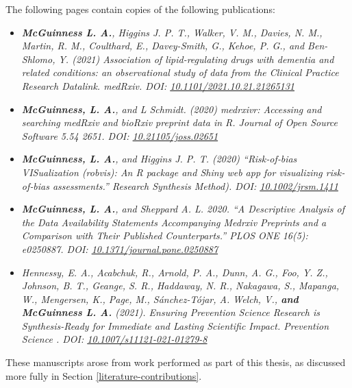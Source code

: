 \documentclass[a4paper, twoside]{templates/ociamthesis}
\newcommand*{\bibtitle}{Bibliography}
\begin{document}
The following pages contain copies of the following publications:

\begin{itemize}
\item
  \emph{\textbf{McGuinness L. A.}, Higgins J. P. T., Walker, V. M., Davies, N. M., Martin, R. M., Coulthard, E., Davey-Smith, G., Kehoe, P. G., and Ben-Shlomo, Y. (2021) Association of lipid-regulating drugs with dementia and related conditions: an observational study of data from the Clinical Practice Research Datalink. medRxiv. DOI: \href{https://doi.org/10.1101/2021.10.21.21265131}{10.1101/2021.10.21.21265131}}
\item
  \emph{\textbf{McGuinness, L. A.}, and L Schmidt. (2020) medrxivr: Accessing and searching medRxiv and bioRxiv preprint data in R. Journal of Open Source Software 5.54 2651. DOI: \href{https://doi.org/10.21105/joss.02651}{10.21105/joss.02651}}
\item
  \emph{\textbf{McGuinness, L. A.}, and Higgins J. P. T. (2020) ``Risk‐of‐bias VISualization (robvis): An R package and Shiny web app for visualizing risk‐of‐bias assessments.'' Research Synthesis Method). DOI: \href{https://doi.org/10.1002/jrsm.1411}{10.1002/jrsm.1411}}
\item
  \emph{\textbf{McGuinness, L. A.}, and Sheppard A. L. 2020. ``A Descriptive Analysis of the Data Availability Statements Accompanying Medrxiv Preprints and a Comparison with Their Published Counterparts.'' PLOS ONE 16(5): e0250887. DOI: \href{https://doi.org/10.1371/journal.pone.0250887}{10.1371/journal.pone.0250887}}
\item
  \emph{Hennessy, E. A., Acabchuk, R., Arnold, P. A., Dunn, A. G., Foo, Y. Z., Johnson, B. T., Geange, S. R., Haddaway, N. R., Nakagawa, S., Mapanga, W., Mengersen, K., Page, M., Sánchez-Tójar, A. Welch, V., \textbf{and McGuinness L. A.} (2021). Ensuring Prevention Science Research is Synthesis-Ready for Immediate and Lasting Scientific Impact. Prevention Science . DOI: \href{https://doi.org/10.1007/s11121-021-01279-8}{10.1007/s11121-021-01279-8}}
\end{itemize}

These manuscripts arose from work performed as part of this thesis, as discussed more fully in Section \ref{literature-contributions}.








\setlength{\baselineskip}{0pt} %

{\renewcommand*\MakeUppercase[1]{#1}%
\printbibliography[heading=bibintoc,title={\bibtitle}]}
\end{document}

